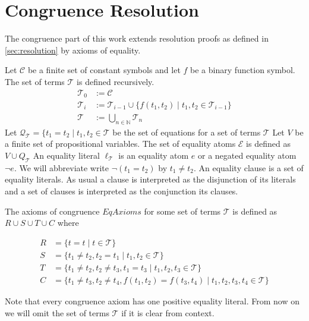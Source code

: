 
\section*{Congruence Resolution}

The congruence part of this work extends resolution proofs as defined in \ref{sec:resolution} by axioms of equality.

Let $\mathcal{C}$ be a finite set of constant symbols and let $f$ be a binary function symbol.
The set of terms $\mathcal{T}$ is defined recursively.
\begin{align*}
	\mathcal{T}_0 &:= \mathcal{C} \\
	\mathcal{T}_i &:= \mathcal{T}_{i-1} \cup \{f(t_1,t_2) \mid t_1, t_2 \in \mathcal{T}_{i-1}\} \\
	\mathcal{T} &:= \bigcup_{n \in \mathbb{N}} \mathcal{T}_n
\end{align*}
Let $\mathcal{Q}_{\mathcal{T}} = \{t_1 = t_2 \mid t_1, t_2 \in \mathcal{T}$ be the set of equations for a set of terms $\mathcal{T}$
Let $V$ be a finite set of propositional variables.
The set of equality atoms $\mathcal{E}$ is defined as $V \cup Q_{\mathcal{T}}$
An equality literal $\ell_\mathcal{T}$ is an equality atom $e$ or a negated equality atom $\neg e$.
We will abbreviate write $\neg (t_1 = t_2)$ by $t_1 \neq t_2$.
An equality clause is a set of equality literals.
As usual a clause is interpreted as the disjunction of its literals and a set of clauses is interpreted as the conjunction its clauses.

The axioms of congruence $EqAxioms$ for some set of terms $\mathcal{T}$ is defined as $R \cup S \cup T \cup C$ where

\begin{align*}
	R &= \{ t = t \mid t \in \mathcal{T}\} \\
	S &= \{ t_1 \neq t_2, t_2 = t_1 \mid t_1, t_2 \in \mathcal{T} \} \\
	T &= \{ t_1 \neq t_2, t_2 \neq t_3, t_1 = t_3 \mid t_1, t_2, t_3 \in \mathcal{T} \} \\
	C &= \{ t_1 \neq t_3, t_2 \neq t_4, f(t_1,t_2) = f(t_3,t_4) \mid t_1, t_2, t_3, t_4 \in \mathcal{T} \} 
\end{align*}

Note that every congruence axiom has one positive equality literal.
From now on we will omit the set of terms $\mathcal{T}$ if it is clear from context.

